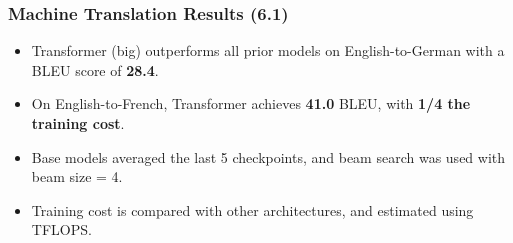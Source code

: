 \documentclass{beamer}
\begin{document}
\begin{frame}

\end{frame}
\begin{frame}
    \frametitle{Machine Translation Results (6.1)}

    \begin{itemize}
        \item Transformer (big) outperforms all prior models on English-to-German with a BLEU score of \textbf{28.4}. \pause
        \item On English-to-French, Transformer achieves \textbf{41.0} BLEU, with \textbf{1/4 the training cost}. \pause
        \item Base models averaged the last 5 checkpoints, and beam search was used with beam size = 4. \pause
        \item Training cost is compared with other architectures, and estimated using TFLOPS. \pause
    \end{itemize}
\end{frame}
\end{document}
